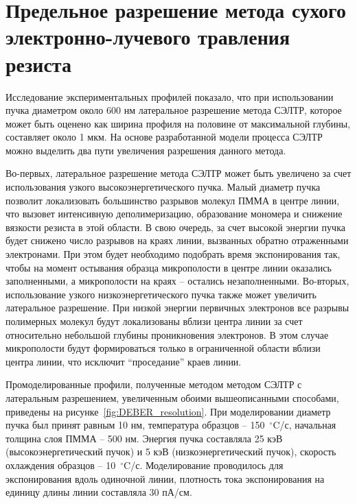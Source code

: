 \section{Предельное разрешение метода сухого электронно-лучевого травления резиста}

Исследование экспериментальных профилей показало, что при использовании пучка диаметром около 600 нм латеральное разрешение метода СЭЛТР, которое может быть оценено как ширина профиля на половине от максимальной глубины, составляет около 1 мкм. На основе разработанной модели процесса СЭЛТР можно выделить два пути увеличения разрешения данного метода.

Во-первых, латеральное разрешение метода СЭЛТР может быть увеличено за счет использования узкого высокоэнергетического пучка. Малый диаметр пучка позволит локализовать большинство разрывов молекул ПММА в центре линии, что вызовет интенсивную деполимеризацию, образование мономера и снижение вязкости резиста в этой области. В свою очередь, за счет высокой энергии пучка будет снижено число разрывов на краях линии, вызванных обратно отраженными электронами. При этом будет необходимо подобрать время экспонирования так, чтобы на момент остывания образца микрополости в центре линии оказались заполненными, а микрополости на краях -- остались незаполненными. Во-вторых, использование узкого низкоэнергетического пучка также может увеличить латеральное разрешение. При низкой энергии первичных электронов все разрывы полимерных молекул будут локализованы вблизи центра линии за счет относительно небольшой глубины проникновения электронов. В этом случае микрополости будут формироваться только в ограниченной области вблизи центра линии, что исключит ``проседание'' краев линии.

Промоделированные профили, полученные методом методом СЭЛТР с латеральным разрешением, увеличенным обоими вышеописанными способами, приведены на рисунке~\ref{fig:DEBER_resolution}. При моделировании диаметр пучка был принят равным 10 нм, температура образцов -- 150~$^\circ$C/с, начальная толщина слоя ПММА -- 500 нм. Энергия пучка составляла 25 кэВ (высокоэнергетический пучок) и 5 кэВ (низкоэнергетический пучок), скорость охлаждения образцов -- 10~$^\circ$C/с. Моделирование проводилось для экспонирования вдоль одиночной линии, плотность тока экспонирования на единицу длины линии составляла 30 пА/см.

